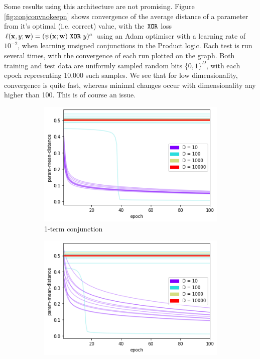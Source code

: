 Some results using this architecture are not promising. Figure \ref{fig:conjconvnokeepn} shows convergence of the average distance of a parameter from it's optimal (i.e. correct) value, with the $\texttt{XOR}$ loss $\ell(\mathbf{x}, y; \mathbf{w}) = (\psi(\mathbf{x};\mathbf{w}) \ \texttt{XOR}\  y)^a$ using an Adam optimiser with a learning rate of $10^{-2}$, when learning unsigned conjunctions in the Product logic. Each test is run several times, with the convergence of each run plotted on the graph. Both training and test data are uniformly sampled random bits $\{0,1\}^D$, with each epoch representing 10,000 such samples. We see that for low dimensionality, convergence is quite fast, whereas minimal changes occur with dimensionality any higher than 100. This is of course an issue.

\begin{figure}[h]
    \centering
    \begin{subfigure}[b]{0.48\textwidth}
        \centering
        \includegraphics[width=\textwidth]{imgs/conj-pmd-prod-nokeepn-1t.png}
        \caption{1-term conjunction}
        \label{fig:conjconvnokeepn1}
    \end{subfigure}
    \begin{subfigure}[b]{0.48\textwidth}
        \centering
        \includegraphics[width=\textwidth]{imgs/conj-pmd-prod-nokeepn-5t.png}

\end{subfigure}
\end{figure}
